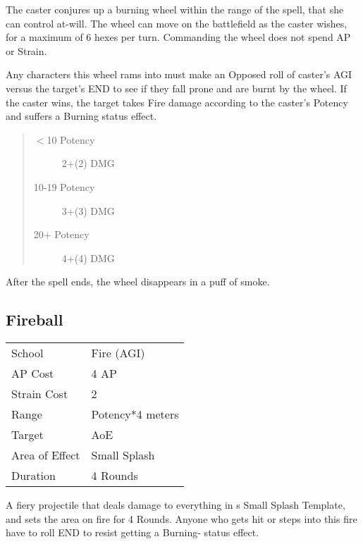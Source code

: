 \documentclass[11pt,a4paper,twocolumn]{book}
\begin{document}
\medskip

The caster conjures up a burning wheel within the range of the spell, that she can control at-will. The wheel can move on the battlefield as the caster wishes, for a maximum of 6 hexes per turn. Commanding the wheel does not spend AP or Strain. 

Any characters this wheel rams into must make an Opposed roll of caster's AGI versus the target's END to see if they fall prone and are burnt by the wheel. If the caster wins, the target takes Fire damage according to the caster's Potency and suffers a Burning status effect.

\begin{quote}
	\begin{description}
		\item[$<$10 Potency] 	2+(2) DMG
		\item[10-19 Potency] 	3+(3) DMG
		\item[20+ Potency]  	4+(4) DMG
	\end{description}	
\end{quote}

After the spell ends, the wheel disappears in a puff of smoke.

\subsection*{Fireball}
{
	\begin{tabu} to 70mm{| X[l,4] | X[l,7] |}
		\hline
		School         & Fire (AGI)       \\
		AP Cost        & 4 AP             \\
		Strain Cost    & 2                \\
		Range          & Potency*4 meters \\
		Target         & AoE              \\
		Area of Effect & Small Splash     \\
		Duration       & 4 Rounds         \\ \hline
	\end{tabu}
	
}

\medskip

A fiery projectile that deals damage to everything in s Small Splash Template, and sets the area on fire for 4 Rounds. Anyone who gets hit or steps into this fire have to roll END to resist getting a Burning- status effect.
\end{document}
